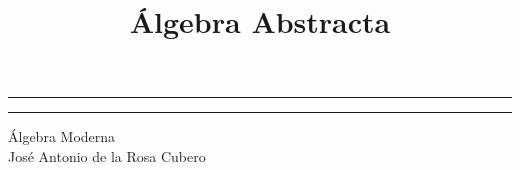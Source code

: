 \documentclass[12pt,a4paper]{article}
\title{Álgebra Abstracta}
\date{}
\theoremstyle{definition}
\theoremstyle{definition}
\theoremstyle{definition}
\theoremstyle{remark}
\theoremstyle{plain}
\theoremstyle{plain}
\theoremstyle{plain}
\begin{document}
\begin{titlepage}

	\centering
	\scshape
	\vspace*{\baselineskip}
	\rule{\textwidth}{1.6pt}\vspace*{-\baselineskip}\vspace*{2pt}
	\rule{\textwidth}{0.4pt}
	\vspace{0.75\baselineskip}
	{\Huge Álgebra Moderna\\}
	\vspace{3cm}
	{\LARGE José Antonio de la Rosa Cubero}
	
\end{titlepage}


\tableofcontents
\newpage













































\end{document}
